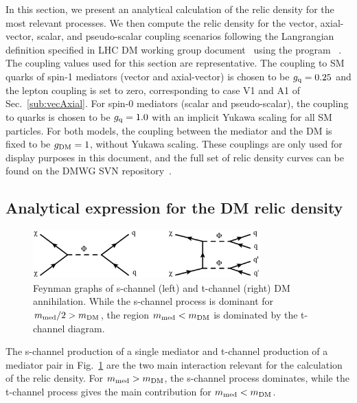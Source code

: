 In this section, we present an analytical calculation of the relic density for the most relevant processes. We then compute the relic density for the vector, axial-vector, scalar, and pseudo-scalar coupling scenarios following the Langrangian definition specified in LHC DM working group document~\cite{Boveia:2016mrp} using the program \maddm~\cite{Backovic:2013dpa,Backovic:2015tpt}. The coupling values used for this section are representative. The coupling to SM quarks of spin-1 mediators (vector and axial-vector) is chosen to be $g_{\rm q} = 0.25$ and the lepton coupling is set to zero, corresponding to case V1 and A1 of Sec.~\ref{sub:vecAxial}. For spin-0 mediators (scalar and pseudo-scalar), the coupling to quarks is chosen to be $g_{\rm q}=1.0$ with an implicit Yukawa scaling for all SM particles. For both models, the coupling between the mediator and the DM is fixed to be $g_{\rm DM}=1$, without Yukawa scaling. These couplings are only used for display purposes in this document, and the full set of relic density curves can be found on the DMWG SVN repository~\cite{SVNRepo}. 

\subsection{Analytical expression for the DM relic density}

\begin{center}
\begin{figure}[!h]
\centering
\includegraphics[width=0.78\textwidth]{figures/DMAnnihilationDiagrams.png} 
\caption{Feynman graphs of s-channel (left) and t-channel (right) DM annihilation. While the s-channel process is dominant for $m_{\rm med}/2 > m_{\rm DM}$, the region $m_{\rm med} < m_{\rm DM}$ is dominated by the t-channel diagram.}
\label{fig:relicprod}
\end{figure}
\end{center}

The s-channel production of a single mediator and t-channel production of a mediator pair in Fig.~\ref{fig:relicprod} are the two main interaction relevant for the calculation of the relic density.
For $m_{\rm med} > m_{\rm DM}$, the s-channel process dominates, while the t-channel process gives the main contribution for $m_{\rm med} < m_{\rm DM}$.

